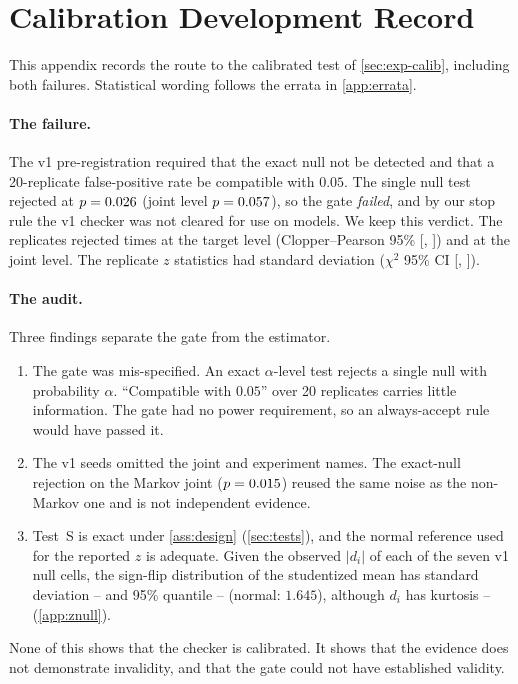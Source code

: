 \documentclass{article}
\theoremstyle{plain}
\theoremstyle{definition}
\theoremstyle{remark}
\begin{document}
\section{Calibration Development Record}
\begin{table}[h]
\centering
\caption{Calibration of Test~P (single run; moved here from the main text). Rejection counts over independent replicates, with the one-sided 95\% bounds used by the gate (together an equal-tailed two-sided 90\% interval) and the two-sided 95\% Clopper--Pearson interval.}
\label{tab:calib}
\scriptsize
\setlength{\tabcolsep}{2pt}

\end{table}

\label{app:calibhistory}\label{sec:calib}
This appendix records the route to the calibrated test of \cref{sec:exp-calib}, including both failures. Statistical wording follows the errata in \cref{app:errata}.


\paragraph{The failure.}
The v1 pre-registration required that the exact null not be detected and that a 20-replicate false-positive rate be compatible with $0.05$.
The single null test rejected at $p=0.026$ (joint level $p=0.057$), so the gate \emph{failed}, and by our stop rule the v1 checker was not cleared for use on models.
We keep this verdict.
The replicates rejected \numRepRejT{} times at the target level (Clopper--Pearson 95\% [\numRepCPlo, \numRepCPhi]) and \numRepRejJ{} at the joint level. The replicate $z$ statistics had standard deviation \numRepZsd{} ($\chi^2$ 95\% CI [\numRepZsdLo, \numRepZsdHi]).

\paragraph{The audit.}
Three findings separate the gate from the estimator.
\begin{enumerate}
\item The gate was mis-specified. An exact $\alpha$-level test rejects a single null with probability $\alpha$. ``Compatible with $0.05$'' over 20 replicates carries little information. The gate had no power requirement, so an always-accept rule would have passed it.
\item The v1 seeds omitted the joint and experiment names. The exact-null rejection on the Markov joint ($p=0.015$) reused the same noise as the non-Markov one and is not independent evidence.
\item Test~S is exact under \cref{ass:design} (\cref{sec:tests}), and the normal reference used for the reported $z$ is adequate. Given the observed $|d_i|$ of each of the seven v1 null cells, the sign-flip distribution of the studentized mean has standard deviation \numZflipSdMin--\numZflipSdMax{} and 95\% quantile \numZflipQmin--\numZflipQmax{} (normal: $1.645$), although $d_i$ has kurtosis \numKurtMin--\numKurtMax{} (\cref{app:znull}).
\end{enumerate}
None of this shows that the checker is calibrated. It shows that the evidence does not demonstrate invalidity, and that the gate could not have established validity.
\end{document}
